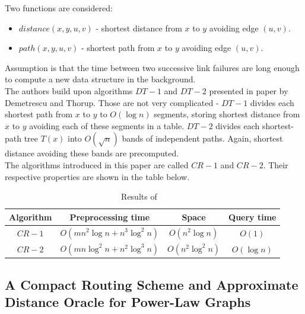 \documentclass[a4paper]{article}
\begin{document}
        Two functions are considered:
        \begin{itemize}
          \item $distance(x, y, u, v)$ - shortest distance from $x$ to $y$ avoiding edge $(u, v)$.
          \item $path(x, y, u, v)$ - shortest path from $x$ to $y$ avoiding edge $(u, v)$.
        \end{itemize}
        \hspace*{\fill}

        Assumption is that the time between two successive link failures are long enough to compute a new data structure in the background. \\

        The authors build upon algorithms $DT-1$ and $DT-2$ presented in paper by Demetrescu and Thorup. Those are not very complicated - $DT-1$ divides each shortest path from $x$ to $y$ to $O(\log n)$ segments, storing shortest distance from $x$ to $y$ avoiding each of these segments in a table. $DT-2$ divides each shortest-path tree $T(x)$ into $O(\sqrt n)$ bands of independent paths. Again, shortest distance avoiding these bands are precomputed. \\

        The algorithms introduced in this paper are called $CR-1$ and $CR-2$. Their respective properties are shown in the table below.

        \begin{table}[h]
            \caption{Results of ~\cite{linkfailure02}}
            \small
            \begin{tabular}{c|c|c|c}
                \hline
                    \rowcolor{tablehead}
                    \textbf{Algorithm} & \textbf{Preprocessing time} & \textbf{Space} & \textbf{Query time}
                \\ \hline
                    $CR-1$ & $O(mn^2 \log n + n^3 \log^2 n)$ & $O(n^2 \log n)$ & $O(1)$ \\
                    $CR-2$ & $O(mn \log^2 n + n^2 \log^3 n)$ & $O(n^2 \log^2 n)$ & $O(\log n)$ \\
            \end{tabular}
            \normalsize
        \end{table}

        \subsection{A Compact Routing Scheme and Approximate Distance Oracle for Power-Law Graphs}
        \label{subsec:powerlaw}
\end{document}
